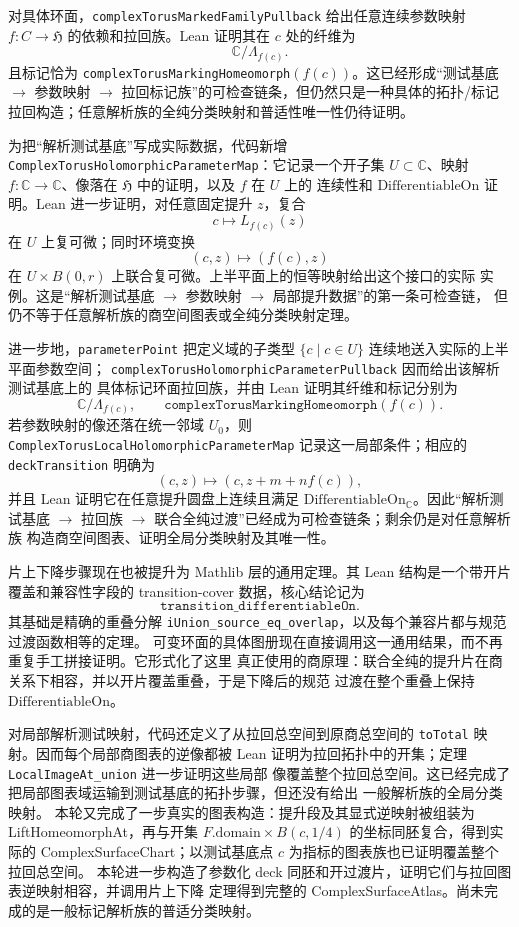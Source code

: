 \documentclass[UTF8,fontset=none,a4paper,11pt]{ctexart}
\begin{document}
对具体环面，\texttt{complexTorusMarkedFamily\allowbreak Pullback} 给出任意连续参数映射
\(f:C\to\mathfrak H\) 的依赖和拉回族。Lean 证明其在 \(c\) 处的纤维为
\[
  \mathbb C/\Lambda_{f(c)}.
\]
且标记恰为
\texttt{complexTorusMarking\allowbreak Homeomorph}\((f(c))\)。这已经形成“测试基底
\(\to\) 参数映射 \(\to\) 拉回标记族”的可检查链条，但仍然只是一种具体的拓扑/标记
拉回构造；任意解析族的全纯分类映射和普适性唯一性仍待证明。

为把“解析测试基底”写成实际数据，代码新增
\texttt{ComplexTorusHolomorphicParameterMap}：它记录一个开子集
\(U\subset\mathbb C\)、映射 \(f:\mathbb C\to\mathbb C\)、像落在
\(\mathfrak H\) 中的证明，以及 \(f\) 在 \(U\) 上的
连续性和 \(\mathrm{DifferentiableOn}\) 证明。Lean 进一步证明，对任意固定提升 \(z\)，复合
\[
  c\longmapsto L_{f(c)}(z)
\]
在 \(U\) 上复可微；同时环境变换
\[
  (c,z)\longmapsto(f(c),z)
\]
在 \(U\times B(0,r)\) 上联合复可微。上半平面上的恒等映射给出这个接口的实际
实例。这是“解析测试基底 \(\to\) 参数映射 \(\to\) 局部提升数据”的第一条可检查链，
但仍不等于任意解析族的商空间图表或全纯分类映射定理。

进一步地，\texttt{parameterPoint} 把定义域的子类型
\(\{c\mid c\in U\}\) 连续地送入实际的上半平面参数空间；
\texttt{complexTorusHolomorphicParameterPullback} 因而给出该解析测试基底上的
具体标记环面拉回族，并由 Lean 证明其纤维和标记分别为
\[
  \mathbb C/\Lambda_{f(c)},\qquad
  \texttt{complexTorusMarkingHomeomorph}(f(c)).
\]
若参数映射的像还落在统一邻域 \(U_0\)，则
\texttt{ComplexTorusLocalHolomorphicParameterMap} 记录这一局部条件；相应的
\texttt{deckTransition} 明确为
\[
  (c,z)\longmapsto(c,z+m+n f(c)),
\]
并且 Lean 证明它在任意提升圆盘上连续且满足
\(\mathrm{DifferentiableOn}_{\mathbb C}\)。因此“解析测试基底
\(\to\) 拉回族 \(\to\) 联合全纯过渡”已经成为可检查链条；剩余仍是对任意解析族
构造商空间图表、证明全局分类映射及其唯一性。

片上下降步骤现在也被提升为 Mathlib 层的通用定理。其 Lean 结构是一个带开片覆盖和兼容性字段的 transition-cover 数据，核心结论记为
\[
  \texttt{transition\_differentiableOn}.
\]
其基础是精确的重叠分解
\texttt{iUnion\_source\_eq\_overlap}，以及每个兼容片都与规范过渡函数相等的定理。
可变环面的具体图册现在直接调用这一通用结果，而不再重复手工拼接证明。它形式化了这里
真正使用的商原理：联合全纯的提升片在商关系下相容，并以开片覆盖重叠，于是下降后的规范
过渡在整个重叠上保持 \(\mathrm{DifferentiableOn}\)。

对局部解析测试映射，代码还定义了从拉回总空间到原商总空间的
\texttt{toTotal} 映射。因而每个局部商图表的逆像都被 Lean 证明为拉回拓扑中的开集；定理
\texttt{LocalImageAt\_union} 进一步证明这些局部
像覆盖整个拉回总空间。这已经完成了把局部图表域运输到测试基底的拓扑步骤，但还没有给出
一般解析族的全局分类映射。
本轮又完成了一步真实的图表构造：提升段及其显式逆映射被组装为
LiftHomeomorphAt，再与开集
\(F.\mathrm{domain}\times B(c,1/4)\) 的坐标同胚复合，得到实际的
ComplexSurfaceChart；以测试基底点 \(c\) 为指标的图表族也已证明覆盖整个拉回总空间。
本轮进一步构造了参数化 deck 同胚和开过渡片，证明它们与拉回图表逆映射相容，并调用片上下降
定理得到完整的 ComplexSurfaceAtlas。尚未完成的是一般标记解析族的普适分类映射。
\end{document}
